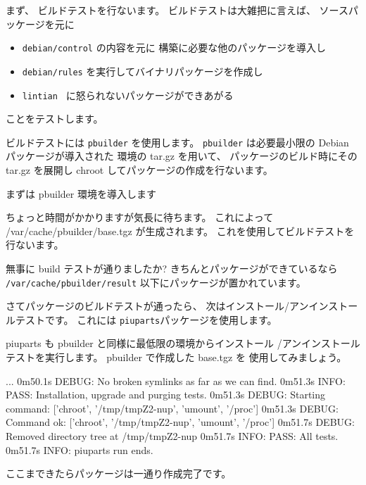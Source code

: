 \documentclass[mingoth,a4paper]{jsarticle}
\begin{document}
まず、 ビルドテストを行ないます。
ビルドテストは大雑把に言えば、 
ソースパッケージを元に
\begin{itemize}
      \item {\tt debian/control} の内容を元に
    構築に必要な他のパッケージを導入し
      \item {\tt debian/rules} を実行してバイナリパッケージを作成し
      \item {\tt lintian } に怒られないパッケージができあがる
\end{itemize}
ことをテストします。

ビルドテストには {\tt pbuilder} を使用します。
{\tt pbuilder} は必要最小限の Debian パッケージが導入された
環境の tar.gz を用いて、 
パッケージのビルド時にその tar.gz を展開し
chroot してパッケージの作成を行ないます。

まずは pbuilder 環境を導入します%
\begin{commandline}
\end{commandline}
ちょっと時間がかかりますが気長に待ちます。
これによって /var/cache/pbuilder/base.tgz が生成されます。
これを使用してビルドテストを行ないます。
\begin{commandline}
\end{commandline}
無事に build テストが通りましたか? きちんとパッケージができているなら
{\tt /var/cache/pbuilder/result} 以下にパッケージが置かれています。

さてパッケージのビルドテストが通ったら、 
次はインストール/アンインストールテストです。
これには {\tt piuparts}パッケージを使用します。
\begin{commandline}
\end{commandline}

piuparts も pbuilder と同様に最低限の環境からインストール
/アンインストールテストを実行します。 pbuilder で作成した base.tgz を
使用してみましょう。
\begin{commandline}
...
0m50.1s DEBUG: No broken symlinks as far as we can find.
0m51.3s INFO: PASS: Installation, upgrade and purging tests.
0m51.3s DEBUG: Starting command: ['chroot', '/tmp/tmpZ2-nup', 'umount', '/proc']
0m51.3s DEBUG: Command ok: ['chroot', '/tmp/tmpZ2-nup', 'umount', '/proc']
0m51.7s DEBUG: Removed directory tree at /tmp/tmpZ2-nup
0m51.7s INFO: PASS: All tests.
0m51.7s INFO: piuparts run ends.
\end{commandline}
ここまできたらパッケージは一通り作成完了です。
\end{document}
